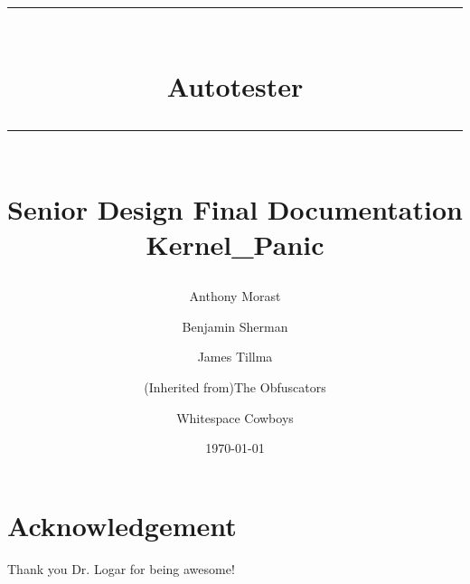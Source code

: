 \documentclass{book}
\title{{\color{MSBlue1} \rule{\linewidth}{0.5mm}}\\[2mm] {\huge \bfseries \color{MSBlue1} Autotester }\\[-1mm] {\color{MSBlue1}\rule{\linewidth}{0.5mm}} \\  \vfill
{\LARGE \bfseries \color{MSBlue2} Senior Design Final Documentation }\\  \vfill 
{\color{MSBlue1} Kernel\_Panic} }
\author{\color{MSBlue1}  Anthony Morast \and \color{MSBlue1} Benjamin Sherman\and  \color{MSBlue1} James Tillma \and  \color{MSBlue1} (Inherited from)The Obfuscators  \and Whitespace Cowboys}
\date{\color{MSBlue1} \today}
\begin{document}
\frontmatter
\maketitle


\tableofcontents
\listoffigures
\listoftables
\listofalgorithms




 
\mainmatter













\backmatter
\chapter{Acknowledgement}
\label{SpecialThanks}  Thank you Dr. Logar for being awesome! 


\setcounter{section}{0}



\setcounter{section}{0}
%


%
%
\end{document}
